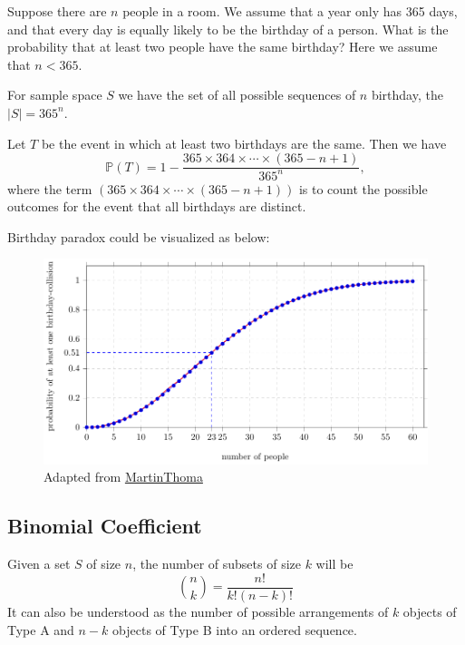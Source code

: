 \begin{eg}
    Suppose there are \(n\) people in a room. We assume that a year only has 365 days, and that every day is equally likely to be the birthday of a person. What is the probability that at least two people have the same birthday? Here we assume that \(n < 365\). 

    For sample space \(S\) we have the set of all possible sequences of \(n\) birthday, the \(\vert S \vert = 365^n\). 

    Let \(T\) be the event in which at least two birthdays are the same. Then we have
    \[
        \mathbb{P}(T) = 1 - \dfrac{365 \times 364 \times \cdots \times (365 - n + 1)}{365^n},
    \]
    where the term \((365 \times 364 \times \cdots \times (365 - n + 1))\) is to count the possible outcomes for the event that all birthdays are distinct.
\end{eg}
Birthday paradox could be visualized as below:
\begin{figure}[H]
\includegraphics{Figures/Birthday_paradox.pdf}
\caption*{Adapted from \href{https://github.com/MartinThoma/LaTeX-examples/tree/2286e6e3833904b2c058b2a855db9b7f81776c59/tikz/birthday-paradox}{MartinThoma}}
\end{figure}

\subsection{Binomial Coefficient}
\begin{proposition}
    Given a set \(S\) of size \(n\), the number of subsets of size \(k\) will be 
    \[
        \binom{n}{k} = \dfrac{n!}{k!(n-k)!}
    \]
    It can also be understood as the number of possible arrangements of \(k\) objects of Type A and \(n - k\) objects of Type B into an ordered sequence.
\end{proposition}

